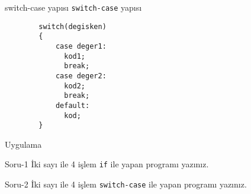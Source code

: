 \begin{frame}[fragile]{switch-case yapısı}
    \lstinline{switch-case} yapısı
    \begin{lstlisting}
        switch(degisken)
        {
            case deger1:
              kod1;
              break;
            case deger2:
              kod2;
              break;
            default:
              kod;
        }\end{lstlisting}
\end{frame}
\begin{frame}[fragile]{Uygulama}
    \begin{alertblock}{Soru-1}
        İki sayı ile 4 işlem \lstinline{if} ile yapan programı yazınız.
    \end{alertblock}
    \begin{alertblock}{Soru-2}
        İki sayı ile 4 işlem \lstinline{switch-case} ile yapan programı yazınız.
    \end{alertblock}
\end{frame}
